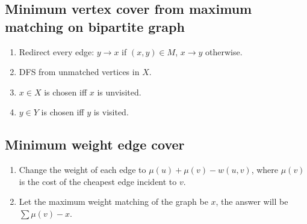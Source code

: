 \subsection{Minimum vertex cover from maximum matching on bipartite graph}
\vspace{-0.2em}
\begin{enumerate}
	\itemsep-0.8em
	\item Redirect every edge: $y \rightarrow x$ if $(x, y) \in M$, $x \rightarrow y$ otherwise.
	\item DFS from unmatched vertices in $X$.
	\item $x \in X$ is chosen iff $x$ is unvisited.
	\item $y \in Y$ is chosen iff $y$ is visited.
\end{enumerate}

\subsection{Minimum weight edge cover}
\vspace{-0.2em}
    \begin{enumerate}
	  \itemsep-0.8em
      \item Change the weight of each edge to $\mu(u) + \mu(v) - w(u, v)$, where $\mu(v)$ is the cost of the cheapest edge incident to $v$.
      \item Let the maximum weight matching of the graph be $x$, the answer will be $\sum \mu(v) - x$.
    \end{enumerate}

